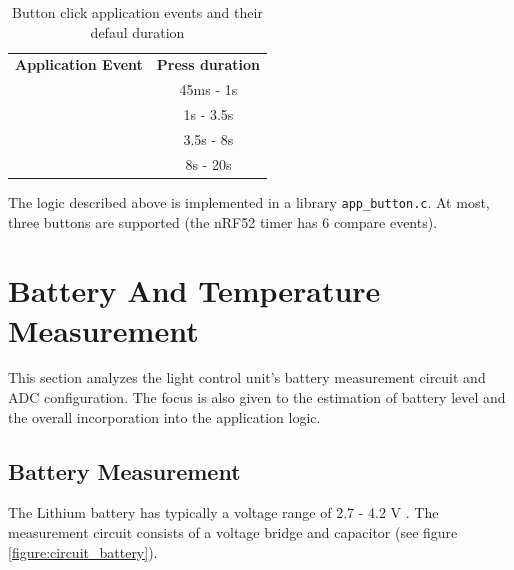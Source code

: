         \begin{table}[!ht]
            \begin{tabular}{l!{\vrule width 1pt}c}
                \textbf{Application Event} &  \textbf{Press duration}\\ 
                \Xhline{1\arrayrulewidth}
                 & 45ms - 1s \\\hline
                 & 1s - 3.5s \\\hline
                 &  3.5s - 8s\\\hline
                 & 8s - 20s \\
            \end{tabular}
            \caption{Button click application events and their defaul duration}
            \label{table:btn_click}
        \end{table}
        
        The logic described above is implemented in a library \verb|app_button.c|. At most, three buttons are supported (the nRF52 timer has 6 compare events).\\
    
    
\section{Battery And Temperature Measurement}
    \label{sec:fw_battery}
    This section analyzes the light control unit's battery measurement circuit and ADC configuration. The focus is also given to the estimation of battery level and the overall incorporation into the application logic.
    
    
    \subsection{Battery Measurement}
        \label{sec:battery_measurment}
        The Lithium battery has typically a voltage range of 2.7 - 4.2 V \cite{web_article:battery}. The measurement circuit consists of a voltage bridge and capacitor (see figure \ref{figure:circuit_battery}).
        
